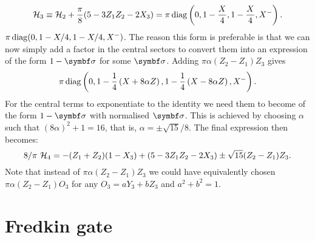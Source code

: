 \begin{equation}
    {\mathcal{H}}_3 \equiv {\mathcal{H}}_2 + \frac{\pi}{8}(5 - 3Z_1Z_2 - 2X_3)
    = \pi\operatorname{diag}\left(0, 1- \frac{X}{4}, 1- \frac{X}{4}, X^-\right). 
\end{equation}
$\pi \operatorname{diag}(0, 1 - X/4, 1 - X/4, X^-)$.
The reason this form is preferable is that we can now simply add a factor in the central sectors to convert them into an expression of the form $1 - \bs\sigma$ for some $\bs\sigma$.
Adding $\pi \alpha (Z_2 - Z_1)Z_3$ gives
\begin{equation}
	\pi\operatorname{diag}\left(
        0,
        1 - \frac14\left(X + 8\alpha Z\right),
        1 - \frac14\left(X - 8\alpha Z\right),
        X^-
    \right).
\end{equation}
For the central terms to exponentiate to the identity we need them to become of the form $1-\bs\sigma$ with normalised $\bs\sigma$.
This is achieved by choosing $\alpha$ such that $(8\alpha)^2+1=16$, that is, $\alpha=\pm\sqrt{15}/8$.
The final expression then becomes:
\begin{equation}
	8/\pi \,\, {\mathcal{H}}_4 = -(Z_1 + Z_2)(1 - X_3)
        + (5 - 3Z_1Z_2 - 2 X_3)
        \pm \sqrt{15} (Z_2 - Z_1)Z_3.
\end{equation}
Note that instead of $\pi \alpha (Z_2 - Z_1)Z_3$ we could have equivalently chosen
$\pi\alpha(Z_2-Z_1)O_3$ for any $O_3 = a Y_3 + b Z_3$ and $a^2 + b^2 = 1$.


\section{Fredkin gate \ccheck\ccheck}
\label{sec:GL:fredkin}

